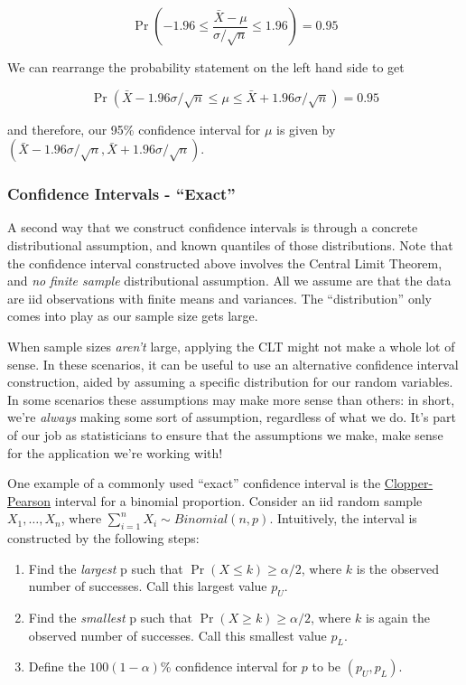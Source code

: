 \documentclass[
  letterpaper,
  DIV=11,
  numbers=noendperiod]{scrreprt}
\begin{document}
\[
\Pr\left(-1.96 \leq \frac{\bar{X} - \mu}{\sigma/\sqrt{n}} \leq 1.96\right) = 0.95
\]

We can rearrange the probability statement on the left hand side to get

\[
\Pr\left(\bar{X}-1.96 \sigma/\sqrt{n} \leq \mu \leq \bar{X} + 1.96\sigma/\sqrt{n}\right) = 0.95
\]

and therefore, our 95\% confidence interval for \(\mu\) is given by
\(\left( \bar{X}-1.96 \sigma/\sqrt{n}, \bar{X}+1.96 \sigma/\sqrt{n} \right)\).

\subsubsection*{Confidence Intervals -
``Exact''}\label{confidence-intervals---exact}

A second way that we construct confidence intervals is through a
concrete distributional assumption, and known quantiles of those
distributions. Note that the confidence interval constructed above
involves the Central Limit Theorem, and \emph{no} \emph{finite sample}
distributional assumption. All we assume are that the data are iid
observations with finite means and variances. The ``distribution'' only
comes into play as our sample size gets large.

When sample sizes \emph{aren't} large, applying the CLT might not make a
whole lot of sense. In these scenarios, it can be useful to use an
alternative confidence interval construction, aided by assuming a
specific distribution for our random variables. In some scenarios these
assumptions may make more sense than others: in short, we're
\emph{always} making some sort of assumption, regardless of what we do.
It's part of our job as statisticians to ensure that the assumptions we
make, make sense for the application we're working with!

One example of a commonly used ``exact'' confidence interval is the
\href{https://en.wikipedia.org/wiki/Binomial_proportion_confidence_interval\#Clopper\%E2\%80\%93Pearson_interval}{Clopper-Pearson}
interval for a binomial proportion. Consider an iid random sample
\(X_1, \dots, X_n\), where \(\sum_{i = 1}^n X_i \sim Binomial(n, p)\).
Intuitively, the interval is constructed by the following steps:

\begin{enumerate}
\def\labelenumi{\arabic{enumi}.}
\item
  Find the \emph{largest} p such that \(\Pr(X \leq k) \geq \alpha/2\),
  where \(k\) is the observed number of successes. Call this largest
  value \(p_U\).
\item
  Find the \emph{smallest} p such that \(\Pr(X \geq k) \geq \alpha/2\),
  where \(k\) is again the observed number of successes. Call this
  smallest value \(p_L\).
\item
  Define the \(100(1 -\alpha)\)\% confidence interval for \(p\) to be
  \((p_U, p_L)\).
\end{enumerate}
\end{document}
